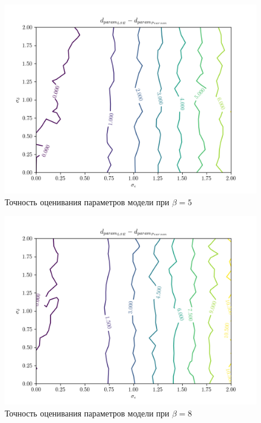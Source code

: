 \begin{figure}[h]
  \centering
  \includegraphics[width=150mm]{fig/linear/param/beta-5_param.png}
  \caption{Точность оценивания параметров модели при \( \beta = 5 \)}
\end{figure}

\begin{figure}[h]
  \centering
  \includegraphics[width=150mm]{fig/linear/param/beta-8_param.png}
  \caption{Точность оценивания параметров модели при \( \beta = 8 \)}
\end{figure}
